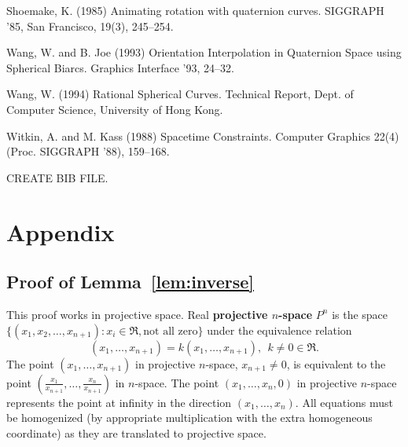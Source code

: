\documentclass[12pt]{article}
\begin{document}
\begin{thebibliography}{99}
Shoemake, K. (1985) Animating rotation with quaternion curves.
SIGGRAPH '85, San Francisco, 19(3), 245--254.

Wang, W. and B. Joe (1993)
Orientation Interpolation in Quaternion Space using Spherical Biarcs.
Graphics Interface '93, 24--32.

Wang, W. (1994)
Rational Spherical Curves.
Technical Report, Dept. of Computer Science, University of Hong Kong.

Witkin, A. and M. Kass (1988)
Spacetime Constraints.
Computer Graphics 22(4) (Proc. SIGGRAPH '88), 159--168.


\end{thebibliography}

CREATE BIB FILE.

\clearpage

\section{Appendix}
\label{sec:appendix}

\subsection{Proof of Lemma~\ref{lem:inverse}}

This proof works in projective space.
Real {\bf projective $n$-space} $P^n$ is the space 
$\{ (x_1,x_2,\ldots,x_{n+1}) : x_i \in \Re, \mbox{not all zero} \}$
under the equivalence relation 
\begin{equation}
\label{eq:projequivalence}
(x_1,\ldots,x_{n+1}) = k(x_1,\ldots,x_{n+1}),\ \ k \neq 0 \in \Re.
\end{equation}
The point $(x_1,\ldots,x_{n+1})$ in projective $n$-space, $x_{n+1} \neq 0$,
is equivalent to the point $(\frac{x_1}{x_{n+1}},\ldots,\frac{x_n}{x_{n+1}})$
in $n$-space.
The point $(x_1,\ldots,x_n,0)$ in projective $n$-space represents the point
at infinity in the direction $(x_1,\ldots,x_n)$.
All equations must be homogenized (by appropriate multiplication 
with the extra homogeneous coordinate) as they are translated to projective space.
\end{document}
